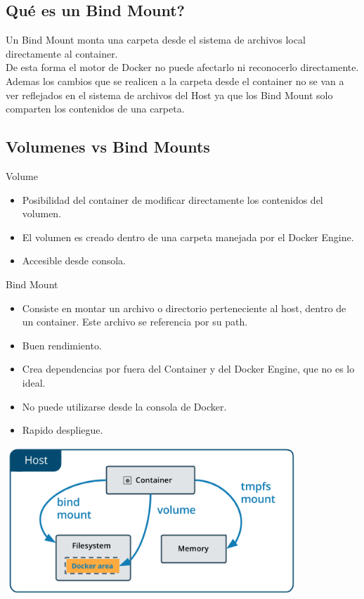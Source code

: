 \documentclass{beamer}
\begin{document}
\subsection{Qué es un Bind Mount?}

\begin{frame}
	Un Bind Mount monta una carpeta desde el sistema de archivos local directamente al container. \\
	De esta forma el motor de Docker no puede afectarlo ni reconocerlo directamente. \\
	\vspace{.3cm}
	Ademas los cambios que se realicen a la carpeta desde el container no se van a ver reflejados en el sistema de archivos
	del Host ya que los Bind Mount solo comparten los contenidos de una carpeta. \\
\end{frame}

\subsection{Volumenes vs Bind Mounts}

\begin{frame}
	Volume
	\begin{itemize}
		\item
		Posibilidad del container de modificar directamente los contenidos del volumen.
		\item
		El volumen es creado dentro de una carpeta manejada por el Docker Engine.
		\item
		Accesible desde consola.
	\end{itemize}
	Bind Mount
	\begin{itemize}
		\item
		Consiste en montar un archivo o directorio perteneciente al host, dentro de un container. Este archivo se referencia por su path.
		\item
		Buen rendimiento.
		\item
		Crea dependencias por fuera del Container y del Docker Engine, que no es lo ideal.
		\item
		No puede utilizarse desde la consola de Docker.
		\item
		Rapido despliegue.
	\end{itemize}
\end{frame}

\begin{frame}
	\includegraphics[width=11cm, height=5.5cm]{volume}
\end{frame}
\end{document}
